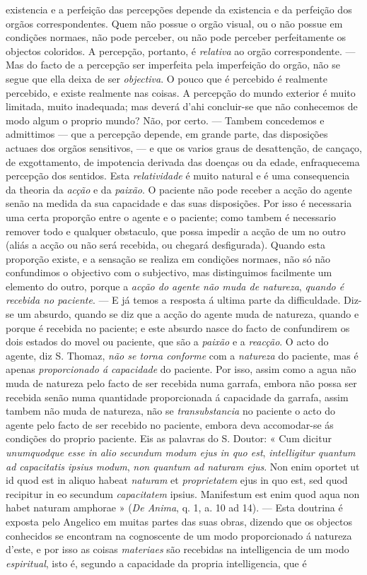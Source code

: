 existencia e a perfeição das percepções depende da existencia e da perfeição dos orgãos correspondentes. Quem não possue o orgão visual, ou o não possue em condições normaes, não pode perceber, ou não pode perceber perfeitamente os objectos coloridos. A percepção, portanto, é \emph{relativa} ao orgão correspondente. --- Mas do facto de a percepção ser imperfeita pela imperfeição do orgão, não se segue que ella deixa de ser \emph{objectiva}. O pouco que é percebido é realmente percebido, e existe realmente nas coisas. A percepção do mundo exterior é muito limitada, muito inadequada; mas deverá d'ahi concluir-se que não conhecemos de modo algum o proprio mundo? Não, por certo. --- Tambem concedemos e admittimos --- que a percepção depende, em grande parte, das disposições actuaes dos orgãos sensitivos, --- e que os varios graus de desattenção, de cançaço, de exgottamento, de impotencia derivada das doenças ou da edade, enfraquecema percepção dos sentidos. Esta \emph{relatividade} é muito natural e é uma consequencia da theoria da \emph{acção} e da \emph{paixão}. O paciente não pode receber a acção do agente senão na medida da sua capacidade e das suas disposições. Por isso é necessaria uma certa proporção entre o agente e o paciente; como tambem é necessario remover todo e qualquer obstaculo, que possa impedir a acção de um no outro (aliás a acção ou não será recebida, ou chegará desfigurada). Quando esta proporção existe, e a sensação se realiza em condições normaes, não só não confundimos o objectivo com o subjectivo, mas distinguimos facilmente um elemento do outro, porque a \emph{acção do agente não muda de natureza}, \emph{quando é recebida no paciente}. --- E já temos a resposta á ultima parte da difficuldade. Diz-se um absurdo, quando se diz que a acção do agente muda de natureza, quando e porque é recebida no paciente; e este absurdo nasce do facto de confundirem os dois estados do movel ou paciente, que são a \emph{paixão} e a \emph{reacção}. O acto do agente, diz S. Thomaz, \emph{não se torna conforme} com a \emph{natureza} do paciente, mas é apenas \emph{proporcionado á capacidade} do paciente. Por isso, assim como a agua não muda de natureza pelo facto de ser recebida numa garrafa, embora não possa ser recebida senão numa quantidade proporcionada á capacidade da garrafa, assim tambem não muda de natureza, não se \emph{transubstancia} no paciente o acto do agente pelo facto de ser recebido no paciente, embora deva accomodar-se ás condições do proprio paciente. Eis as palavras do S. Doutor: « Cum dicitur \emph{unumquodque esse in alio secundum modum ejus in quo est}, \emph{intelligitur quantum ad capacitatis ipsius modum}, \emph{non quantum ad naturam ejus}. Non enim oportet ut id quod est in aliquo habeat \emph{naturam} et \emph{proprietatem} ejus in quo est, sed quod recipitur in eo secundum \emph{capacitatem} ipsius. Manifestum est enim quod aqua non habet naturam amphorae » (\emph{De Anima}, q. 1, a. 10 ad 14). --- Esta doutrina é exposta pelo Angelico em muitas partes das suas obras, dizendo que os objectos conhecidos se encontram na cognoscente de um modo proporcionado á natureza d'este, e por isso as coisas \emph{materiaes} são recebidas na intelligencia de um modo \emph{espiritual}, isto é, segundo a capacidade da propria intelligencia, que é 